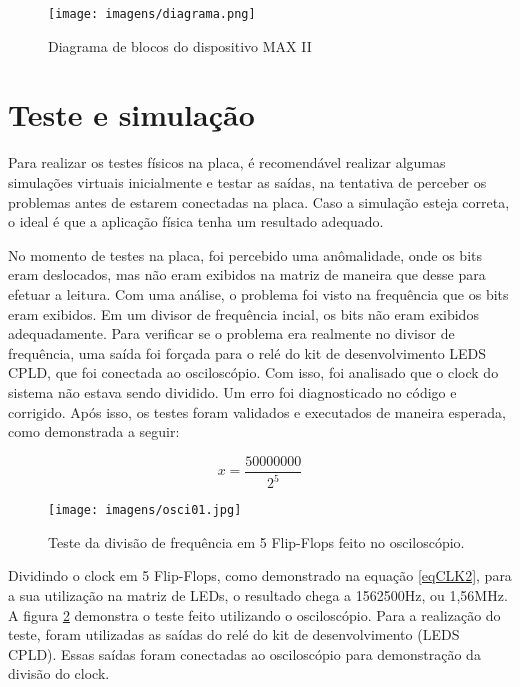 \begin{figure}[!h]
  \centering
    \texttt{[image: imagens/diagrama.png]}
  \caption{Diagrama de blocos do dispositivo MAX II}
  \label{fig:diagramadeblocos}
\end{figure}

\section{Teste e simulação}

Para realizar os testes físicos na placa, é recomendável realizar algumas simulações virtuais inicialmente e testar as saídas, na tentativa de perceber os problemas antes de estarem conectadas na placa. Caso a simulação esteja correta, o ideal é que a aplicação física tenha um resultado adequado. 

No momento de testes na placa, foi percebido uma anômalidade, onde os bits eram deslocados, mas não eram exibidos na matriz de maneira que desse para efetuar a leitura. Com uma análise, o problema foi visto na frequência que os bits eram exibidos. Em um divisor de frequência incial, os bits não eram exibidos adequadamente. Para verificar se o problema era realmente no divisor de frequência, uma saída foi forçada para o relé do kit de desenvolvimento LEDS CPLD, que foi conectada ao osciloscópio. Com isso, foi analisado que o clock do sistema não estava sendo dividido. Um erro foi diagnosticado no código e corrigido. Após isso, os testes foram validados e executados de maneira esperada, como demonstrada a seguir:

\begin{equation} \label{eqCLK2}
    x=\frac{50000000}{2^5}
\end{equation}

\begin{figure}[!h]
    \centering
    \texttt{[image: imagens/osci01.jpg]}
    \caption{Teste da divisão de frequência em 5 Flip-Flops feito no osciloscópio.}
    \label{fig:osci5}
\end{figure}

Dividindo o clock em 5 Flip-Flops, como demonstrado na equação \ref{eqCLK2}, para a sua utilização na matriz de LEDs, o resultado chega a 1562500Hz, ou 1,56MHz. A figura \ref{fig:osci5} demonstra o teste feito utilizando o osciloscópio. Para a realização do teste, foram utilizadas as saídas do relé do kit de desenvolvimento (LEDS CPLD). Essas saídas foram conectadas ao osciloscópio para demonstração da divisão do clock.


